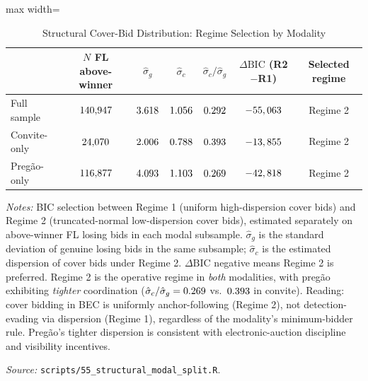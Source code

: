 \begin{table}[htbp]
\centering
\caption{Structural Cover-Bid Distribution: Regime Selection by Modality}
\label{tab:structural_modal}
\begin{adjustbox}{max width=\textwidth}
\begin{threeparttable}
\small
\begin{tabular}{lcccccc}
\toprule
& $N$ FL above-winner & $\hat{\sigma}_g$ & $\hat{\sigma}_c$ & $\hat{\sigma}_c/\hat{\sigma}_g$ & $\Delta\mathrm{BIC}$ (R2$-$R1) & Selected regime \\
\midrule
Full sample   & $140{,}947$ & $3.618$ & $1.056$ & $0.292$ & $-55,063$ & Regime 2 \\
Convite-only  & $24{,}070$ & $2.006$ & $0.788$ & $0.393$ & $-13,855$ & Regime 2 \\
Preg\~ao-only & $116{,}877$ & $4.093$ & $1.103$ & $0.269$ & $-42,818$ & Regime 2 \\
\bottomrule
\end{tabular}
\begin{tablenotes}
\small
\item \textit{Notes:} BIC selection between Regime 1 (uniform
high-dispersion cover bids) and Regime 2 (truncated-normal
low-dispersion cover bids), estimated separately on
above-winner FL losing bids in each modal subsample.
$\hat{\sigma}_g$ is the standard deviation of genuine
losing bids in the same subsample; $\hat{\sigma}_c$ is the
estimated dispersion of cover bids under Regime 2.
$\Delta\mathrm{BIC}$ negative means Regime 2 is preferred.
Regime 2 is the operative regime in \emph{both} modalities,
with pregão exhibiting \emph{tighter} coordination
($\hat{\sigma}_c/\hat{\sigma}_g = 0.269$ vs.\
$0.393$ in convite). Reading: cover bidding in
BEC is uniformly anchor-following (Regime 2), not
detection-evading via dispersion (Regime 1), regardless of
the modality's minimum-bidder rule. Pregão's tighter
dispersion is consistent with electronic-auction discipline
and visibility incentives.
\item \textit{Source:} \texttt{scripts/55\_structural\_modal\_split.R}.
\end{tablenotes}
\end{threeparttable}
\end{adjustbox}
\end{table}

